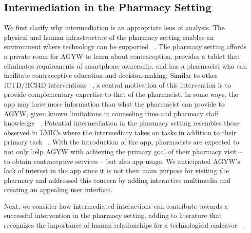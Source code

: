 \subsection{Intermediation in the Pharmacy Setting}
We first clarify why intermediation is an appropriate lens of analysis. The physical and human infrastructure of the pharmacy setting enables an environment where technology can be supported ~\cite{10.1145/1753326.1753718, 1626204}. The pharmacy setting affords a private room for AGYW to learn about contraception, provides a tablet that eliminates requirements of smartphone ownership, and has a pharmacist who can facilitate contraceptive education and decision-making. Similar to other ICTD/HCI4D interventions ~\cite{4937388, 10.1145/2737856.2738023}, a central motivation of this intervention is to provide complementary expertise to that of the pharmacist. In some ways, the app may have more information than what the pharmacist can provide to AGYW, given known limitations in counseling time and pharmacy staff knowledge ~\cite{gonsalves2020pharmacists, gonsalves2019regulating}. Potential intermediation in the pharmacy setting resembles those observed in LMICs where the intermediary takes on tasks in addition to their primary task ~\cite{10.1145/3613904.3642099, 10.1145/3449118, 10.1145/2909609.2909655}. With the introduction of the app, pharmacists are expected to not only help AGYW with achieving the primary goal of their pharmacy visit – to obtain contraceptive services – but also app usage. We anticipated AGYW's lack of interest in the app since it is not their main purpose for visiting the pharmacy and addressed this concern by adding interactive multimedia and creating an appealing user interface.

Next, we consider how intermediated interactions can contribute towards a successful intervention in the pharmacy setting, adding to literature that recognizes the importance of human relationships for a technological endeavor ~\cite{10.1145/2369220.2369258, 1626204, 10.1145/3613904.3642099}. 


